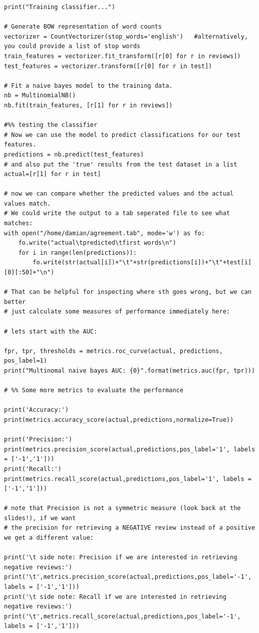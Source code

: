 \documentclass[a4paper,12pt]{book}
\begin{document}
\begin{lstlisting}
print("Training classifier...")        

# Generate BOW representation of word counts
vectorizer = CountVectorizer(stop_words='english')   #alternatively, you could provide a list of stop words
train_features = vectorizer.fit_transform([r[0] for r in reviews])
test_features = vectorizer.transform([r[0] for r in test])

# Fit a naive bayes model to the training data.
nb = MultinomialNB()
nb.fit(train_features, [r[1] for r in reviews])

#%% testing the classifier
# Now we can use the model to predict classifications for our test features.
predictions = nb.predict(test_features)
# and also put the 'true' results from the test dataset in a list
actual=[r[1] for r in test]

# now we can compare whether the predicted values and the actual values match.
# We could write the output to a tab seperated file to see what matches:
with open("/home/damian/agreement.tab", mode='w') as fo:
    fo.write("actual\tpredicted\tfirst words\n")
    for i in range(len(predictions)):
        fo.write(str(actual[i])+"\t"+str(predictions[i])+"\t"+test[i][0][:50]+"\n")

# That can be helpful for inspecting where sth goes wrong, but we can better 
# just calculate some measures of performance immediately here:

# lets start with the AUC:

fpr, tpr, thresholds = metrics.roc_curve(actual, predictions, pos_label=1)
print("Multinomal naive bayes AUC: {0}".format(metrics.auc(fpr, tpr)))

# %% Some more metrics to evaluate the performance

print('Accuracy:')
print(metrics.accuracy_score(actual,predictions,normalize=True))

print('Precision:')
print(metrics.precision_score(actual,predictions,pos_label='1', labels = ['-1','1']))
print('Recall:')
print(metrics.recall_score(actual,predictions,pos_label='1', labels = ['-1','1']))

# note that Precision is not a symmetric measure (look back at the slides!), if we want
# the precision for retrieving a NEGATIVE review instead of a positive we get a different value:

print('\t side note: Precision if we are interested in retrieving negative reviews:')
print('\t',metrics.precision_score(actual,predictions,pos_label='-1', labels = ['-1','1']))
print('\t side note: Recall if we are interested in retrieving negative reviews:')
print('\t',metrics.recall_score(actual,predictions,pos_label='-1', labels = ['-1','1']))


\end{lstlisting}
\end{document}
